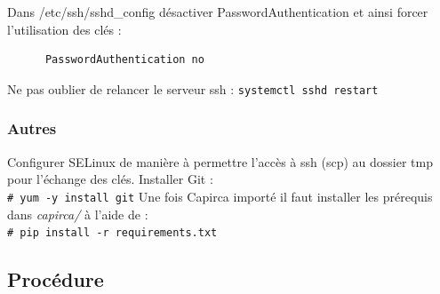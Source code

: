 \documentclass{article}
\newcommand{\shellcmdd}[1]{\\\indent\indent\texttt{\footnotesize\# #1}}
\begin{document}
      \noindent Dans /etc/ssh/sshd\_config désactiver PasswordAuthentication et ainsi forcer l'utilisation des clés :
\begin{verbatim}
      PasswordAuthentication no
\end{verbatim}
      \noindent Ne pas oublier de relancer le serveur ssh : \texttt{systemctl sshd restart}

    \subsubsection{Autres}

      \noindent Configurer SELinux de manière à permettre l'accès à ssh (scp) au dossier tmp pour l'échange des clés.
      \noindent Installer Git : \shellcmdd{yum -y install git} \smallbreak
      \noindent Une fois Capirca importé il faut installer les prérequis dans \textit{capirca/} à l'aide de :
      \shellcmdd{pip install -r requirements.txt}

    \subsection{Procédure}
\end{document}
